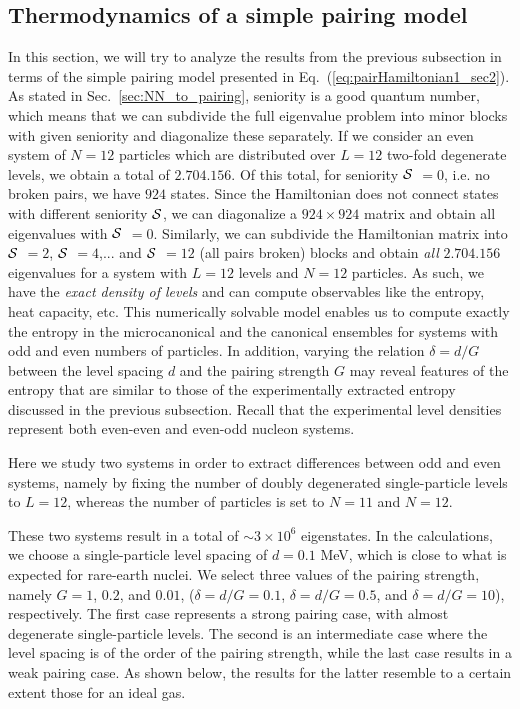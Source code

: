 \documentclass[rmp,aps,floatfix]{revtex4}
\begin{document}
\subsection{Thermodynamics of a simple pairing model}
\label{subsec:statprops}


In this section, we will try to analyze the results from the previous
subsection in terms of the simple pairing model presented in 
Eq.~(\ref{eq:pairHamiltonian1_sec2}). 
As stated in Sec.~\ref{sec:NN_to_pairing}, seniority is
a good quantum number, which 
means that we can subdivide the full eigenvalue problem 
into minor blocks with given seniority and diagonalize these 
separately. 
If we consider an even  system of $N=12$ 
particles which are distributed over $L=12$ two-fold 
degenerate levels, we obtain a total of $2.704.156$.
Of this total, for seniority
$\cal{S}$ $=0$, i.e. no broken pairs, we have $924$
states. Since the Hamiltonian does not connect states with 
different seniority $\cal{S}$, we can diagonalize a 
$924\times 924$ matrix and obtain all eigenvalues with 
$\cal{S}$ $=0$. Similarly, we can subdivide the Hamiltonian 
matrix into $\cal{S}$ $=2$, $\cal{S}$ $=4$,... and 
$\cal{S}$ $=12$ (all pairs broken) blocks and obtain 
{\em all} $2.704.156$ eigenvalues for a system with $L=12$ 
levels and $N=12$ particles. As such, we have the 
{\em exact density of levels} and can compute observables like the 
entropy, heat capacity, etc. This numerically solvable model 
enables us to compute exactly the entropy in the microcanonical 
and the canonical ensembles for systems with odd and even numbers 
of particles.  In addition, varying the relation $\delta=d/G$  between the 
level spacing $d$ and the pairing 
strength $G$ may reveal features of the entropy that are 
similar to those of the experimentally extracted entropy discussed
in the previous subsection. Recall that the experimental level densities  
represent both even-even and even-odd nucleon systems.

Here we study two systems in order to extract differences 
between odd and even systems, namely by fixing the number of 
doubly degenerated single-particle levels to $L=12$, whereas the 
number of particles is set to $N=11$ and $N=12$.  

These two systems result in a total of 
$\sim 3 \times 10^6$ eigenstates. In the calculations, we 
choose a single-particle level spacing of $d=0.1$ MeV, which is close 
to what is expected for rare-earth nuclei. 
We select three values of the pairing strength, 
namely $G=1$, $0.2$, and $0.01$, 
($\delta=d/G=0.1$, $\delta=d/G=0.5$, and $\delta=d/G=10$), 
respectively. The first case represents a strong 
pairing case, with almost degenerate single-particle levels. The 
second is an intermediate case where the level spacing is of 
the order of the pairing strength, while the last case results in 
a weak pairing case. As shown below, the results for the latter 
resemble to a certain extent those for an ideal gas.
\end{document}
